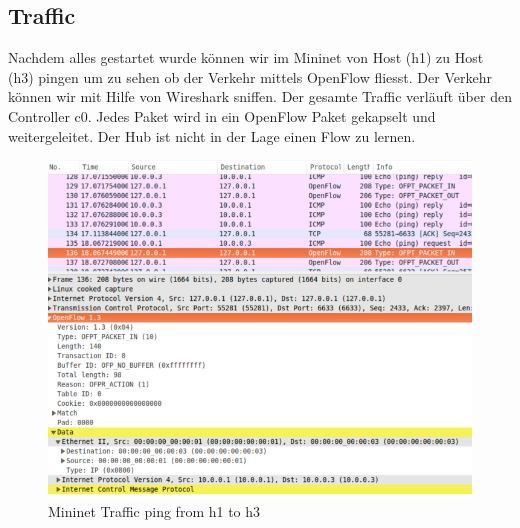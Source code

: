 \documentclass[a4,12pt]{scrartcl}
\begin{document}
\subsection{Traffic}
Nachdem alles gestartet wurde können wir im Mininet von Host (h1) zu Host (h3) pingen um zu sehen ob der Verkehr mittels OpenFlow fliesst. Der Verkehr können wir mit Hilfe von Wireshark sniffen. Der gesamte Traffic verläuft über den Controller c0. Jedes Paket wird in ein OpenFlow Paket gekapselt und weitergeleitet. Der Hub ist nicht in der Lage einen Flow zu lernen. 
\begin{figure} [H]
	\begin{center}
	\includegraphics[width=1.00\textwidth]{./pictures/simple_hub_traffic.png}
	\caption{Mininet Traffic ping from h1 to h3}
	\label{x}
	\end{center}
\end{figure} 
\newpage
\end{document}
